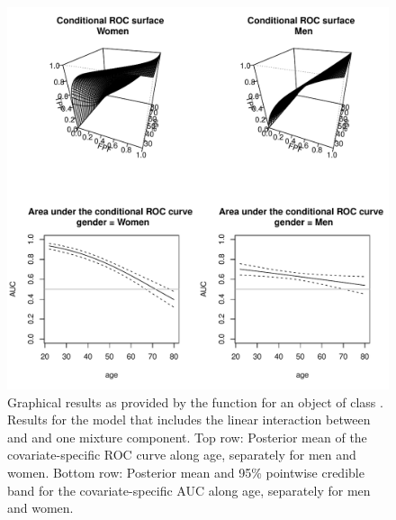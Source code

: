 \begin{figure}[ht!]
\begin{center}
\includegraphics[width=14cm]{cROC_bp.pdf}
\end{center}
\caption{Graphical results as provided by the  function for an object of class . Results for the model that includes the linear interaction between  and  and one mixture component. Top row: Posterior mean of the covariate-specific ROC curve along age, separately for men and women. Bottom row: Posterior mean and 95\% pointwise credible band for the covariate-specific AUC along age, separately for men and women.}
\label{cROC_bp_plot}
\end{figure}


